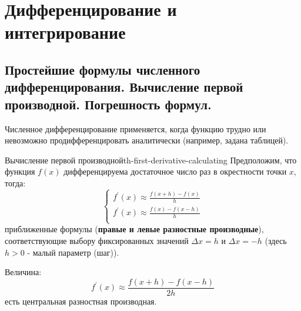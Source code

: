 \documentclass[14pt]{extarticle}
\begin{document}
\section{Дифференцирование и интегрирование}

\subsection{Простейшие формулы численного дифференцирования. Вычисление первой производной. Погрешность формул.}

    Численное дифференцирование применяется, когда функцию трудно или невозможно продифференцировать аналитически (например, задана таблицей).    

    \begin{theorem}{Вычисление первой производной}{th-first-derivative-calculating}
        Предположим, что функция $f(x)$ дифференцируема достаточное число раз в окрестности точки $x$, тогда:
        $$
        \begin{cases}
            f^{'}(x) \approx \frac{f(x + h) - f(x)}{h}\\
            f^{'}(x) \approx \frac{f(x) - f(x - h)}{h}\\
        \end{cases}
        $$
        приближенные формулы (\textbf{правые и левые разностные производные}), соответствующие выбору фиксированных значений $\Delta x = h$ и $\Delta x = -h$ (здесь $h>0$ - малый параметр (шаг)).
    
        \vspace{\baselineskip}

        Величина:
        $$f^{'}(x) \approx \frac{f(x + h) - f(x - h)}{2h}$$
        есть центральная разностная производная.
    \end{theorem}
\end{document}
